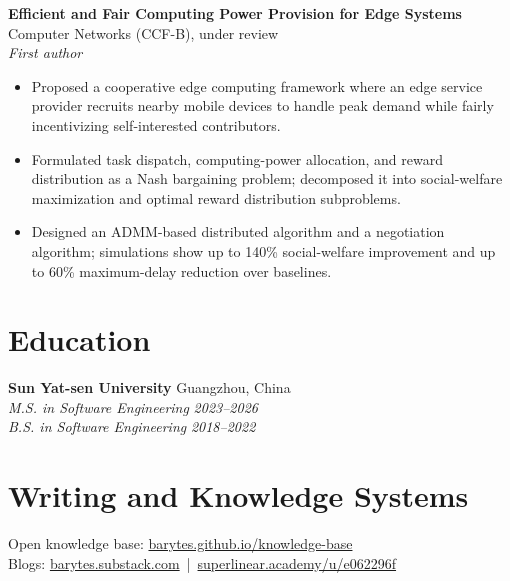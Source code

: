 \documentclass[10pt,letterpaper]{article}
\newcommand{\resumeItem}[1]{\item #1}
\newcommand{\resumeSubheading}[4]{
  \textbf{#1} \hfill #2 \\
  \textit{#3} \hfill \textit{#4}
}
\begin{document}
\resumeSubheading{Efficient and Fair Computing Power Provision for Edge Systems}{Computer Networks (CCF-B), under review}
{First author}{}
\begin{itemize}
  \resumeItem{Proposed a cooperative edge computing framework where an edge service provider recruits nearby mobile devices to handle peak demand while fairly incentivizing self-interested contributors.}
  \resumeItem{Formulated task dispatch, computing-power allocation, and reward distribution as a Nash bargaining problem; decomposed it into social-welfare maximization and optimal reward distribution subproblems.}
  \resumeItem{Designed an ADMM-based distributed algorithm and a negotiation algorithm; simulations show up to 140\% social-welfare improvement and up to 60\% maximum-delay reduction over baselines.}
\end{itemize}

\section{Education}

\textbf{Sun Yat-sen University} \hfill Guangzhou, China \\
\textit{M.S. in Software Engineering} \hfill \textit{2023--2026} \\
\textit{B.S. in Software Engineering} \hfill \textit{2018--2022}

\section{Writing and Knowledge Systems}
Open knowledge base: \href{https://barytes.github.io/knowledge-base}{barytes.github.io/knowledge-base} \\
Blogs: \href{https://barytes.substack.com}{barytes.substack.com} \,|\,
\href{https://www.superlinear.academy/u/e062296f}{superlinear.academy/u/e062296f}
\end{document}
